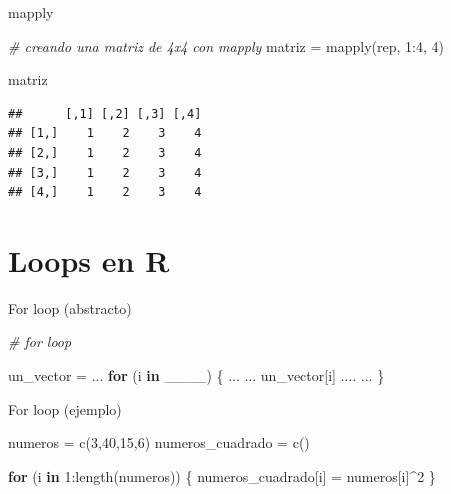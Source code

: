 \documentclass[
  ignorenonframetext,
]{beamer}
\newenvironment{Shaded}{\begin{snugshade}}{\end{snugshade}}
\newcommand{\CommentTok}[1]{\textcolor[rgb]{0.56,0.35,0.01}{\textit{#1}}}
\newcommand{\ControlFlowTok}[1]{\textcolor[rgb]{0.13,0.29,0.53}{\textbf{#1}}}
\newcommand{\DecValTok}[1]{\textcolor[rgb]{0.00,0.00,0.81}{#1}}
\newcommand{\FunctionTok}[1]{\textcolor[rgb]{0.00,0.00,0.00}{#1}}
\newcommand{\NormalTok}[1]{#1}
\newcommand{\OtherTok}[1]{\textcolor[rgb]{0.56,0.35,0.01}{#1}}
\newcommand{\SpecialCharTok}[1]{\textcolor[rgb]{0.00,0.00,0.00}{#1}}
\begin{document}
\begin{frame}[fragile]{mapply}
\protect\hypertarget{mapply}{}
\begin{Shaded}
\begin{Highlighting}[]
\CommentTok{\# creando una matriz de 4x4 con mapply}
\NormalTok{matriz }\OtherTok{=} \FunctionTok{mapply}\NormalTok{(rep, }\DecValTok{1}\SpecialCharTok{:}\DecValTok{4}\NormalTok{, }\DecValTok{4}\NormalTok{)}

\NormalTok{matriz}
\end{Highlighting}
\end{Shaded}

\begin{verbatim}
##      [,1] [,2] [,3] [,4]
## [1,]    1    2    3    4
## [2,]    1    2    3    4
## [3,]    1    2    3    4
## [4,]    1    2    3    4
\end{verbatim}
\end{frame}

\hypertarget{loops-en-r}{%
\section{Loops en R}\label{loops-en-r}}

\begin{frame}[fragile]{For loop (abstracto)}
\protect\hypertarget{for-loop-abstracto}{}
\begin{Shaded}
\begin{Highlighting}[]
\CommentTok{\# for loop}

\NormalTok{un\_vector }\OtherTok{=}\NormalTok{ ...}
\ControlFlowTok{for}\NormalTok{ (i }\ControlFlowTok{in}\NormalTok{ \_\_\_\_) \{}
\NormalTok{  ...}
\NormalTok{  ... un\_vector[i] ....}
\NormalTok{  ...}
\NormalTok{\}}
\end{Highlighting}
\end{Shaded}
\end{frame}

\begin{frame}[fragile]{For loop (ejemplo)}
\protect\hypertarget{for-loop-ejemplo}{}
\begin{Shaded}
\begin{Highlighting}[]
\NormalTok{numeros }\OtherTok{=} \FunctionTok{c}\NormalTok{(}\DecValTok{3}\NormalTok{,}\DecValTok{40}\NormalTok{,}\DecValTok{15}\NormalTok{,}\DecValTok{6}\NormalTok{)}
\NormalTok{numeros\_cuadrado }\OtherTok{=} \FunctionTok{c}\NormalTok{()}

\ControlFlowTok{for}\NormalTok{ (i }\ControlFlowTok{in} \DecValTok{1}\SpecialCharTok{:}\FunctionTok{length}\NormalTok{(numeros)) \{}
\NormalTok{  numeros\_cuadrado[i] }\OtherTok{=}\NormalTok{ numeros[i]}\SpecialCharTok{\^{}}\DecValTok{2}
\NormalTok{\}}
\end{Highlighting}
\end{Shaded}
\end{frame}
\end{document}
